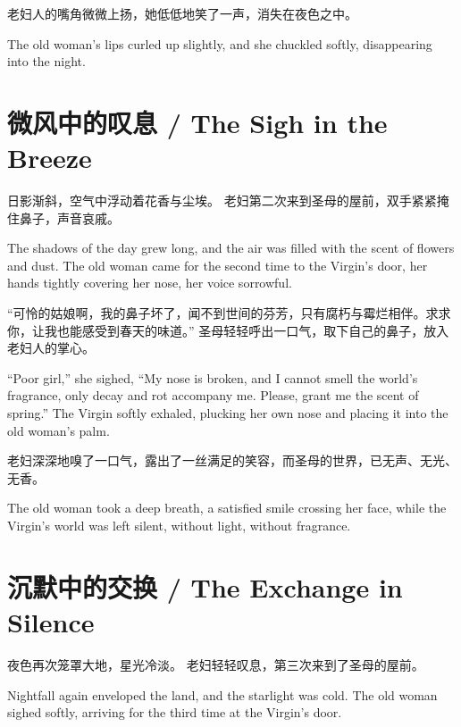 老妇人的嘴角微微上扬，她低低地笑了一声，消失在夜色之中。  
\begin{flushright}
The old woman's lips curled up slightly, and she chuckled softly, disappearing into the night.
\end{flushright}

\section*{微风中的叹息 / The Sigh in the Breeze}

日影渐斜，空气中浮动着花香与尘埃。  
老妇第二次来到圣母的屋前，双手紧紧掩住鼻子，声音哀戚。  
\begin{flushright}
The shadows of the day grew long, and the air was filled with the scent of flowers and dust.  
The old woman came for the second time to the Virgin's door, her hands tightly covering her nose, her voice sorrowful.
\end{flushright}

“可怜的姑娘啊，我的鼻子坏了，闻不到世间的芬芳，只有腐朽与霉烂相伴。求求你，让我也能感受到春天的味道。”  
圣母轻轻呼出一口气，取下自己的鼻子，放入老妇人的掌心。  
\begin{flushright}
“Poor girl,” she sighed, “My nose is broken, and I cannot smell the world's fragrance, only decay and rot accompany me. Please, grant me the scent of spring.”  
The Virgin softly exhaled, plucking her own nose and placing it into the old woman's palm.
\end{flushright}

老妇深深地嗅了一口气，露出了一丝满足的笑容，而圣母的世界，已无声、无光、无香。  
\begin{flushright}
The old woman took a deep breath, a satisfied smile crossing her face, while the Virgin's world was left silent, without light, without fragrance.
\end{flushright}

\section*{沉默中的交换 / The Exchange in Silence}

夜色再次笼罩大地，星光冷淡。  
老妇轻轻叹息，第三次来到了圣母的屋前。  
\begin{flushright}
Nightfall again enveloped the land, and the starlight was cold.  
The old woman sighed softly, arriving for the third time at the Virgin's door.
\end{flushright}

